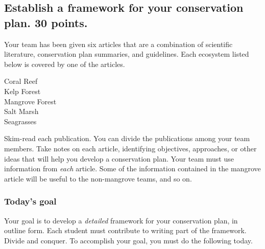 \documentclass[12pt, hidelinks]{exam}
\begin{document}
\subsection*{Establish a framework for your conservation plan. 30 points.}

Your team has been given six articles that are a combination of scientific literature, conservation plan summaries, and guidelines.  Each ecosystem listed below is covered by one of the articles.

\begin{multicols}{2}

Coral Reef\\ 
Kelp Forest\\ 
Mangrove Forest\\
Salt Marsh\\
Seagrasses

\end{multicols}

Skim-read each publication. You can divide the publications among your team members. Take notes on each article, identifying objectives, approaches, or other ideas that will help you develop a conservation plan. Your team must use information from \emph{each} article. Some of the information contained in the mangrove article will be useful to the non-mangrove teams, and so on. 

\subsubsection*{Today's goal}

Your goal is to develop a \emph{detailed} framework for your conservation plan, in outline form. Each student must contribute to writing part of the framework. Divide and conquer. To accomplish your goal, you must do the following today.
\end{document}
